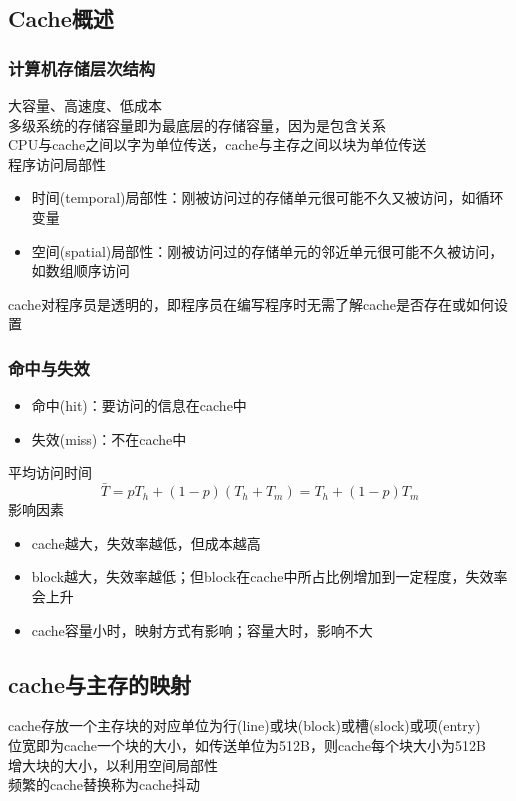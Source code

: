 \subsection{Cache概述}
\subsubsection{计算机存储层次结构}
大容量、高速度、低成本\\
多级系统的存储容量即为最底层的存储容量，因为是包含关系\\
CPU与cache之间以字为单位传送，cache与主存之间以块为单位传送\\
程序访问局部性
\begin{itemize}
	\item 时间(temporal)局部性：刚被访问过的存储单元很可能不久又被访问，如循环变量
	\item 空间(spatial)局部性：刚被访问过的存储单元的邻近单元很可能不久被访问，如数组顺序访问
\end{itemize}
cache对程序员是透明的，即程序员在编写程序时无需了解cache是否存在或如何设置

\subsubsection{命中与失效}
\begin{itemize}
	\item 命中(hit)：要访问的信息在cache中
	\item 失效(miss)：不在cache中
\end{itemize}
平均访问时间
\[\bar{T}=pT_h+(1-p)(T_h+T_m)=T_h+(1-p)T_m\]
影响因素
\begin{itemize}
	\item cache越大，失效率越低，但成本越高
	\item block越大，失效率越低；但block在cache中所占比例增加到一定程度，失效率会上升
	\item cache容量小时，映射方式有影响；容量大时，影响不大
\end{itemize}

\subsection{cache与主存的映射}
cache存放一个主存块的对应单位为行(line)或块(block)或槽(slock)或项(entry)\\
位宽即为cache一个块的大小，如传送单位为512B，则cache每个块大小为512B\\
增大块的大小，以利用空间局部性\\
频繁的cache替换称为cache抖动

